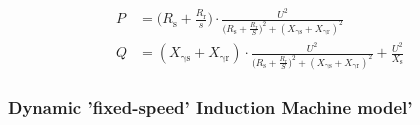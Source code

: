 \begin{align}
        P&=\Bigg( R_\mathrm{s} + \frac{R_\mathrm{r}}{s} \Bigg) \cdot \frac{U^2}{\Big( R_\mathrm{s} + \frac{R_\mathrm{r}}{S} \Big)^2 + (X_\mathrm{\gamma s} + X_\mathrm{\gamma r})^2} \\[12pt]
        Q&=(X_\mathrm{\gamma s} + X_\mathrm{\gamma r}) \cdot \frac{U^2}{\Big( R_\mathrm{s} + \frac{R_\mathrm{r}}{S} \Big)^2 + (X_\mathrm{\gamma s} + X_\mathrm{\gamma r})^2} + \frac{U^2}{X_\mathrm{s}}
\end{align}



\subsubsection{Dynamic 'fixed-speed' Induction Machine model'}

